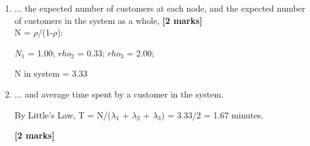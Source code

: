 \begin{enumerate}
\begin{enumerate}
Utilisations are 

$rho_1$ = 0.5; $rho_2$ = 0.25; $rho_3$ = 0.66; 

\item ... the expected number of customers at each node, and 
the expected number of customers in the system as a whole,
\hfill {\bf [2 marks]}\\
N = $\rho$/(1-$\rho$):


$N_1$ = 1.00; $rho_2$ = 0.33; $rho_3$ = 2.00; 

N in system = 3.33


\item ... and average time spent by a customer in the system.  


By Little's Law, T = N/($\lambda_1$ + $\lambda_2$ + $\lambda_3$) =
3.33/2 = 1.67 minutes.


\hfill {\bf [2 marks]}\\

\end{enumerate}
\end{enumerate}


